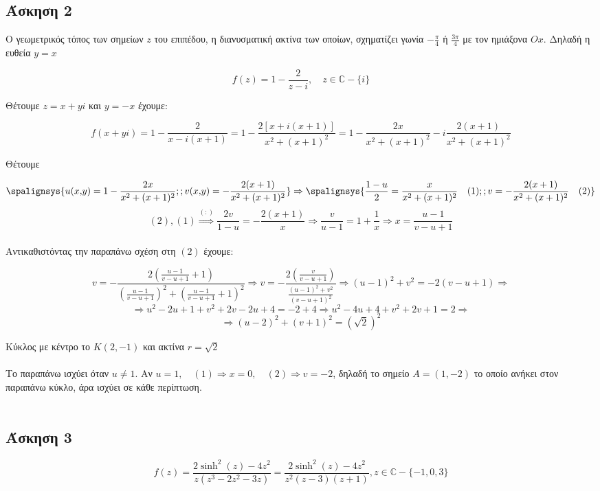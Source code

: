 \documentclass[12pt]{article}
\begin{document}
 \subsection{Άσκηση 2}

Ο γεωμετρικός τόπος των σημείων $z$ του επιπέδου, η διανυσματική ακτίνα των οποίων, σχηματίζει γωνία $-\frac{\pi}{4}$ ή $\frac{3\pi}{4}$  με τον ημιάξονα $Ox$. Δηλαδή η ευθεία $y=x$

$$ f(z)=1 - \frac{2}{z-i} , \quad z \in \mathbb{C}-\{i\}$$

Θέτουμε $ z=x+yi $ και $y=-x$ έχουμε:

$$ f(x+yi)=1-\frac{2}{x-i(x+1)}=1-\frac{2[x+i(x+1)]}{x^2+(x+1)^2}=1-\frac{2x}{x^2+(x+1)^2} -i \frac{2(x+1)}{x^2+(x+1)^2} $$
 
Θέτουμε 

\[
\spalignsys{
u(x{,}y)= 1-\frac{2x}{x^2+(x+1)^2} ; ; v(x{,}y)= -\frac{2(x+1)}{x^2+(x+1)^2}
 } \Rightarrow
 \spalignsys{
\frac{1-u}{2}= \frac{x}{x^2+(x+1)^2} \quad (1); ; v= -\frac{2(x+1)}{x^2+(x+1)^2 }\quad (2)
 } 
  \]
$$ (2),(1) \overset{(:)}{\Longrightarrow} \frac{2v}{1-u}= -\frac{2(x+1)}{x} \Rightarrow \frac{v}{u-1}= 1+\frac{1}{x} \Rightarrow x= \frac{u-1}{v-u+1} $$ 
 \\
 Αντικαθιστόντας την παραπάνω σχέση στη $(2)$ έχουμε:
 
$$ v=-\frac{2\left(\frac{u-1}{v-u+1} +1\right)}{\left( \frac{u-1}{v-u+1} \right)^2+\left(\frac{u-1}{v-u+1} +1 \right)^2} \Rightarrow 
v= -\frac{2\left(\frac{v}{v-u+1}\right)}{ \frac{(u-1)^2+v^2}{(v-u+1)^2}} 
\Rightarrow
(u-1)^2+v^2=-2(v-u+1)
\Rightarrow
$$ 
 $$ \Rightarrow u^2-2u+1+v^2+2v-2u+4=-2+4 \Rightarrow  u^2-4u+4+v^2+2v+1=2 \Rightarrow$$
 $$  \Rightarrow (u-2)^2+(v+1)^2=(\sqrt{2})^2 $$

Κύκλος με κέντρο το $Κ(2,-1)$ και ακτίνα $r=\sqrt{2}$ 
\\ \\
Το παραπάνω ισχύει όταν $u\neq 1$.
Αν $u=1,\quad (1)\Rightarrow x=0, \quad (2) \Rightarrow v=-2$, δηλαδή το σημείο $Α=(1,-2)$ το οποίο ανήκει στον παραπάνω κύκλο, άρα ισχύει σε κάθε περίπτωση.
\\ \\
 
 \newpage
 \subsection{Άσκηση 3}

$$ f(z)=\frac{2\sinh^2(z)-4z^2}{z(z^3-2z^2-3z)}=\frac{2\sinh^2(z)-4z^2}{z^2(z-3)(z+1)},z\in\mathbb{C}-\{-1,0,3\}$$
\end{document}
